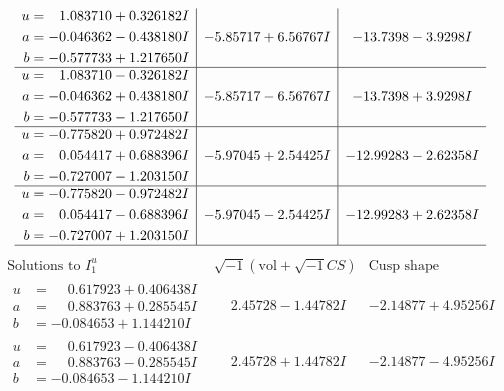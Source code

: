 \documentclass[1p]{elsarticle_modified}
\theoremstyle{definition}
\newcommand{\I}{\sqrt{-1}}
\begin{document}
$$\begin{array}{c|c|c}
\begin{aligned}
u &= \phantom{-}1.083710 + 0.326182 I \\
a &= -0.046362 - 0.438180 I \\
b &= -0.577733 + 1.217650 I\end{aligned}
 & -5.85717 + 6.56767 I & -13.7398 - 3.9298 I \\ \hline\begin{aligned}
u &= \phantom{-}1.083710 - 0.326182 I \\
a &= -0.046362 + 0.438180 I \\
b &= -0.577733 - 1.217650 I\end{aligned}
 & -5.85717 - 6.56767 I & -13.7398 + 3.9298 I \\ \hline\begin{aligned}
u &= -0.775820 + 0.972482 I \\
a &= \phantom{-}0.054417 + 0.688396 I \\
b &= -0.727007 - 1.203150 I\end{aligned}
 & -5.97045 + 2.54425 I & -12.99283 - 2.62358 I \\ \hline\begin{aligned}
u &= -0.775820 - 0.972482 I \\
a &= \phantom{-}0.054417 - 0.688396 I \\
b &= -0.727007 + 1.203150 I\end{aligned}
 & -5.97045 - 2.54425 I & -12.99283 + 2.62358 I\\
 \hline 
 \end{array}$$\newpage$$\begin{array}{c|c|c}  
\text{Solutions to }I^u_{1}& \I (\text{vol} + \sqrt{-1}CS) & \text{Cusp shape}\\
 \hline 
\begin{aligned}
u &= \phantom{-}0.617923 + 0.406438 I \\
a &= \phantom{-}0.883763 + 0.285545 I \\
b &= -0.084653 + 1.144210 I\end{aligned}
 & \phantom{-}2.45728 - 1.44782 I & -2.14877 + 4.95256 I \\ \hline\begin{aligned}
u &= \phantom{-}0.617923 - 0.406438 I \\
a &= \phantom{-}0.883763 - 0.285545 I \\
b &= -0.084653 - 1.144210 I\end{aligned}
 & \phantom{-}2.45728 + 1.44782 I & -2.14877 - 4.95256 I \\ \hline\begin{aligned}

\end{aligned}
\end{array}$$
\end{document}
